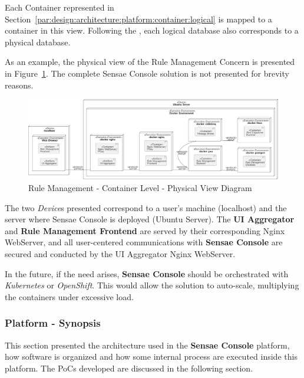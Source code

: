 Each Container represented in Section~\ref{par:design:architecture:platform:container:logical} is mapped to a container in this view. Following the , each logical database also corresponds to a physical database.

As an example, the physical view of the Rule Management Concern is presented in Figure~\ref{fig:design:architecture:platform:container:physical:rule}. The complete Sensae Console solution is not presented for brevity reasons.

\begin{figure}[H]
   \centering
   \includegraphics[page=1,width=\columnwidth]{assets/diagrams/design/architectural/level2/physical/rule-management-context.pdf}
   \caption[Rule Management - Container Level - Physical View Diagram]{Rule Management - Container Level - Physical View Diagram}
   \label{fig:design:architecture:platform:container:physical:rule}
\end{figure}

The two \textit{Device}s presented correspond to a user's machine (localhost) and the server where Sensae Console is deployed (Ubuntu Server). The \textbf{UI Aggregator} and \textbf{Rule Management Frontend} are served by their corresponding Nginx WebServer, and all user-centered communications with \textbf{Sensae Console} are secured and conducted by the UI Aggregator Nginx WebServer.

In the future, if the need arises, \textbf{Sensae Console} should be orchestrated with \textit{Kubernetes} or \textit{OpenShift}. This would allow the solution to auto-scale, multiplying the containers under excessive load.

\subsubsection{Platform - Synopsis}
\label{par:design:architecture:platform:synopsis}

This section presented the architecture used in the \textbf{Sensae Console} platform, how software is organized and how some internal process are executed inside this platform. The \gls{PoC}s developed are discussed in the following section.

